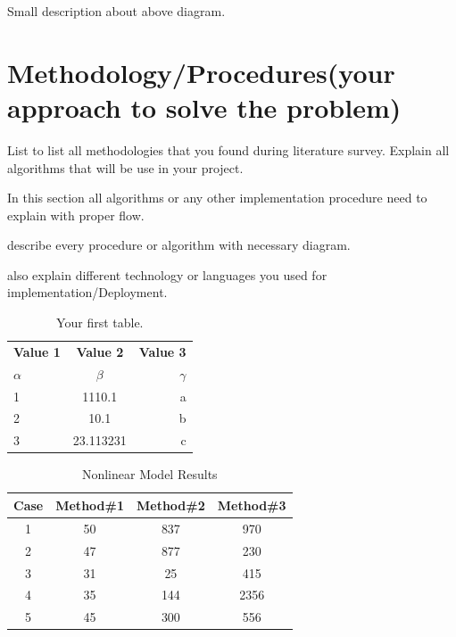 \hspace{5mm}Small description about above diagram.

\section{Methodology/Procedures(your approach to solve the problem)} 
List to list all methodologies that you found during literature survey. Explain all algorithms that will be use in your project.

\hspace{5mm}In this section all algorithms or any other implementation procedure need to explain with proper flow.
\par describe every procedure or algorithm with necessary diagram.
\par also explain different technology or languages you used for implementation/Deployment.

\begin{table}[h!]
  \begin{center}
    \caption{Your first table.}
    \label{tab:table1}
    \begin{tabular}{l|c|r} %
      \textbf{Value 1} & \textbf{Value 2} & \textbf{Value 3}\\
      $\alpha$ & $\beta$ & $\gamma$ \\
      \hline
      1 & 1110.1 & a\\
      \hline
      2 & 10.1 & b\\
      3 & 23.113231 & c\\
    \end{tabular}
  \end{center}
\end{table}

\begin{table}[ht]
\caption{Nonlinear Model Results} %
\centering %
\begin{tabular}{c c c c} %
\hline\hline %
Case & Method\#1 & Method\#2 & Method\#3 \\ [0.5ex] %
\hline %
1 & 50 & 837 & 970 \\ %
2 & 47 & 877 & 230 \\
3 & 31 & 25 & 415 \\
4 & 35 & 144 & 2356 \\
5 & 45 & 300 & 556 \\ [1ex] %
\hline %
\end{tabular}
\label{table:nonlin} %
\end{table}

